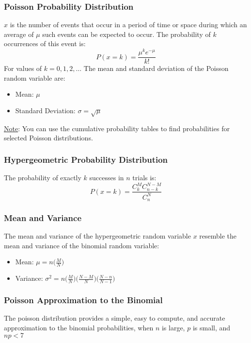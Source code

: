 \documentclass[12pt, letterpaper]{article}
\begin{document}
            \subsubsection{Poisson Probability Distribution}
                $x$ is the number of events that occur in a period of time or space during which an average of $\mu$ such events can be expected to occur. The probability of $k$ occurrences of this event is: \smallskip
                \begin{equation}
                    P(x=k) = \frac{\mu^ke^{-\mu}}{k!}
                \end{equation}
                For values of $k = 0,1,2,\dots$ The mean and standard deviation of the Poisson random variable are:
                \begin{itemize}
                    \item Mean: $\mu$
                    \item Standard Deviation: $\sigma = \sqrt{\mu}$
                \end{itemize}
                \underline{Note}: You can use the cumulative probability tables to find probabilities for selected Poisson distributions.
            \subsubsection{Hypergeometric Probability Distribution}
                The probability of exactly $k$ successes in $n$ trials is: \smallskip
                \begin{equation}
                    P(x=k) = \frac{C^M_kC^{N-M}_{n-k}}{C^N_n}
                \end{equation}
            \subsubsection{Mean and Variance}
                The mean and variance of the hypergeometric random variable $x$ resemble the mean and variance of the binomial random variable: \smallskip
                \begin{itemize}
                    \item Mean: $\mu = n\bigg(\frac{M}{N}\bigg)$
                    \item Variance: $\sigma ^2 = n\bigg(\frac{M}{N}\bigg)\bigg(\frac{N-M}{N}\bigg)\bigg(\frac{N-n}{N-1}\bigg)$
                \end{itemize}
            \subsubsection{Poisson Approximation to the Binomial}
                The poisson distribution provides a simple, easy to compute, and accurate approximation to the binomial probabilities, when $n$ is large, $p$ is small, and $np<7$
\end{document}
